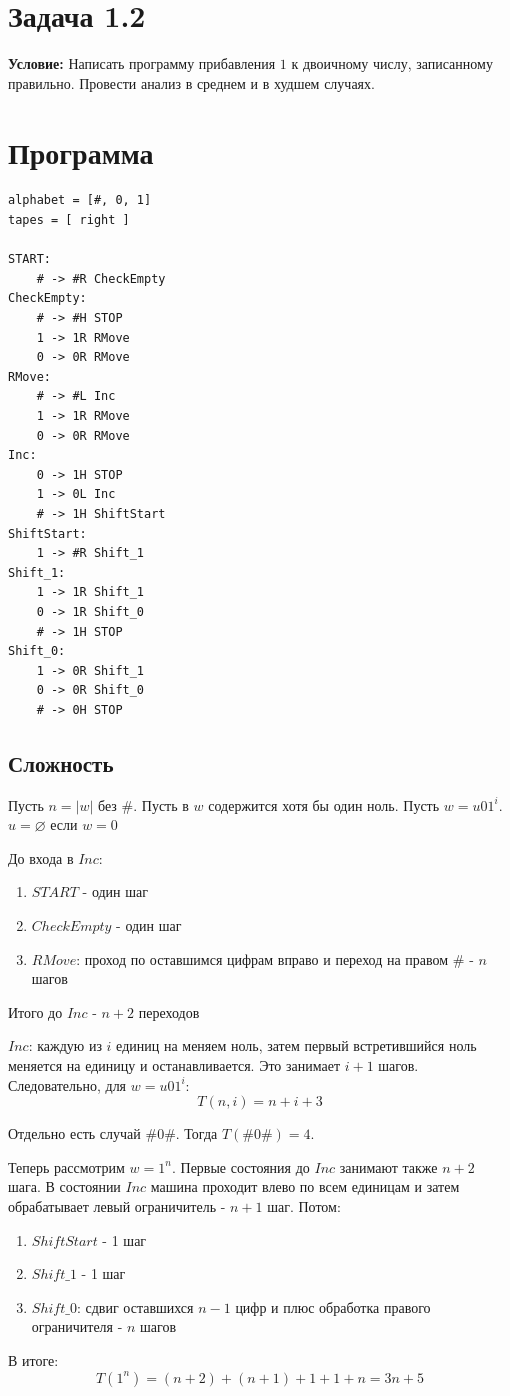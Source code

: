 \documentclass[12pt]{article}
\begin{document}
\section*{Задача 1.2}

\textbf{Условие:} Написать программу прибавления $1$ к двоичному
числу, записанному правильно. Провести анализ в среднем и в худшем
случаях.

\section*{Программа}

\begin{verbatim}
alphabet = [#, 0, 1]
tapes = [ right ]

START:
    # -> #R CheckEmpty
CheckEmpty:
    # -> #H STOP
    1 -> 1R RMove
    0 -> 0R RMove
RMove:
    # -> #L Inc
    1 -> 1R RMove
    0 -> 0R RMove
Inc:
    0 -> 1H STOP
    1 -> 0L Inc
    # -> 1H ShiftStart
ShiftStart:
    1 -> #R Shift_1
Shift_1:
    1 -> 1R Shift_1
    0 -> 1R Shift_0
    # -> 1H STOP
Shift_0:
    1 -> 0R Shift_1
    0 -> 0R Shift_0
    # -> 0H STOP
\end{verbatim}

\subsection*{Сложность}

Пусть $n = |w|$ без $\#$. Пусть в $w$ содержится хотя бы один ноль. Пусть $w=u01^i$. $u=\varnothing$ если $w=0$

До входа в $Inc$:
\begin{enumerate}
    \item $START$ - один шаг
    \item $CheckEmpty$ - один шаг
    \item $RMove$: проход по оставшимся цифрам вправо и переход на правом $\#$ - $n$ шагов
\end{enumerate}
Итого до $Inc$ - $n+2$ переходов

$Inc$: каждую из $i$ единиц на меняем ноль, затем первый встретившийся ноль меняется на единицу и останавливается. Это занимает $i+1$ шагов. Следовательно, для $w=u01^i$: 
\[
    T(n,i)=n+i+3
\]

Отдельно есть случай $\#0\#$. Тогда $T(\#0\#)=4$.

Теперь рассмотрим $w=1^n$. Первые состояния до $Inc$ занимают также $n+2$ шага. В состоянии $Inc$ машина проходит влево по всем единицам и затем обрабатывает левый ограничитель - $n+1$ шаг. Потом:
\begin{enumerate}
    \item $ShiftStart$ - 1 шаг
    \item $Shift\_1$ - 1 шаг
    \item $Shift\_0$: сдвиг оставшихся $n-1$ цифр и плюс обработка правого ограничителя - $n$ шагов
\end{enumerate}
В итоге:
\[
T(1^n)=(n+2)+(n+1)+1+1+n = 3n+5
\]
\end{document}
